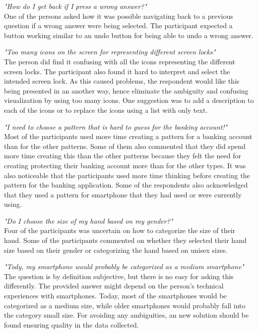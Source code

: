   {\it "How do I get back if I press a wrong answer?"}\\ 
  One of the persons asked how it was possible navigating back to a previous question if a wrong answer were being selected. The participant expected a button working similar to an undo button for being able to undo a wrong answer.

  {\it "Too many icons on the screen for representing different screen locks"}\\ The person did find it confusing with all the icons representing the different screen locks. The participant also found it hard to interpret and select the intended screen lock. As this caused problems, the respondent would like this being presented in an another way, hence eliminate the ambiguity and confusing visualization by using too many icons. One suggestion was to add a description to each of the icons or to replace the icons using a list with only text.

  {\it "I need to choose a pattern that is hard to guess for the banking account!"}\\ 
  Most of the participants used more time creating a pattern for a banking account than for the other patterns. Some of them also commented that they did spend more time creating this than the other patterns because they felt the need for creating protecting their banking account more than for the other types. It was also noticeable that the participants used more time thinking before creating the pattern for the banking application. Some of the respondents also acknowledged that they used a pattern for smartphone that they had used or were currently using. 

  {\it "Do I choose the size of my hand based on my gender?"}\\ 
  Four of the participants was uncertain on how to categorize the size of their hand. Some of the participants commented on whether they selected their hand size based on their gender or categorizing the hand based on unisex sizes.

  {\it "Tody, my smartphone would probably be categorized as a medium smartphone"}\\
  The question is by definition subjective, but there is no easy for asking this differently. The provided answer might depend on the person's technical experiences with smartphones. Today, most of the smartphones would be categorized as a medium size, while older smartphones would probably fall into the category small size. For avoiding any ambiguities, an new solution should be found ensuring quality in the data collected.

